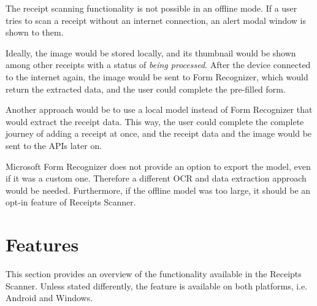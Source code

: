 \documentclass[
  digital, %
  table,   %
  oneside, %
  lof,     %
  lot,     %
]{fithesis3}
\begin{document}
The receipt scanning functionality is not possible in an offline mode. If a user tries to scan a receipt without an internet connection, an alert modal window is shown to them.

Ideally, the image would be stored locally, and its thumbnail would be shown among other receipts with a status of \textit{being processed}. After the device connected to the internet again, the image would be sent to Form Recognizer, which would return the extracted data, and the user could complete the pre-filled form.

Another approach would be to use a local model instead of Form Recognizer that would extract the receipt data. This way, the user could complete the complete journey of adding a receipt at once, and the receipt data and the image would be sent to the APIs later on.

Microsoft Form Recognizer does not provide an option to export the model, even if it was a custom one. Therefore a different OCR and data extraction approach would be needed. Furthermore, if the offline model was too large, it should be an opt-in feature of Receipts Scanner.

\section{Features}
This section provides an overview of the functionality available in the Receipts Scanner. Unless stated differently, the feature is available on both platforms, i.e. Android and Windows.
\end{document}
